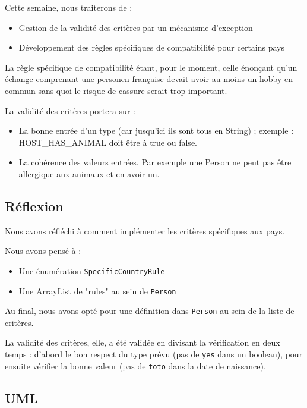 \documentclass{mytex}
\begin{document}
Cette semaine, nous traiterons de : 

\begin{itemize}
	\item Gestion de la validité des critères par un mécanisme d’exception
	\item Développement des règles spécifiques de compatibilité pour certains pays
\end{itemize}

La règle spécifique de compatibilité étant, pour le moment, celle énonçant qu'un échange comprenant une personen française devait avoir au moins un hobby en commun sans quoi le risque de cassure serait trop important.

La validité des critères portera sur :

\begin{itemize}
	\item La bonne entrée d'un type (car jusqu'ici ils sont tous en String) ; exemple : HOST\_HAS\_ANIMAL doit être à true ou false.
	\item La cohérence des valeurs entrées. Par exemple une Person ne peut pas être allergique aux animaux et en avoir un.
\end{itemize}

\subsection{Réflexion}

Nous avons réfléchi à comment implémenter les critères spécifiques aux pays.

Nous avons pensé à :

\begin{itemize}
	\item Une énumération \texttt{SpecificCountryRule}
	\item Une ArrayList de "rules" au sein de \texttt{Person}
\end{itemize}

Au final, nous avons opté pour une définition dans \texttt{Person} au sein de la liste de critères.

La validité des critères, elle, a été validée en divisant la vérification en deux temps : d'abord le bon respect du type prévu (pas de \texttt{yes} dans un boolean), pour ensuite vérifier la bonne valeur (pas de \texttt{toto} dans la date de naissance).

\subsection{UML}
\end{document}
